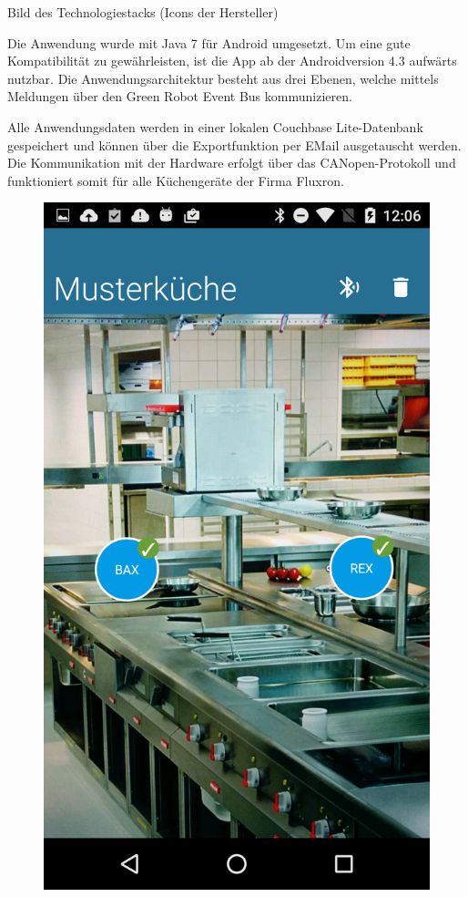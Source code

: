 Bild des Technologiestacks (Icons der Hersteller)

Die Anwendung wurde mit Java 7 für Android umgesetzt. Um eine gute Kompatibilität zu gewährleisten, ist die App ab der Androidversion 4.3 aufwärts nutzbar. Die Anwendungsarchitektur besteht aus drei Ebenen, welche mittels Meldungen über den Green Robot Event Bus kommunizieren.

Alle Anwendungsdaten werden in einer lokalen Couchbase Lite-Datenbank gespeichert und können über die Exportfunktion per EMail ausgetauscht werden. Die Kommunikation mit der Hardware erfolgt über das CANopen-Protokoll und funktioniert somit für alle Küchengeräte der Firma Fluxron.

\begin{figure}
	\vspace{-1.1cm}
	\begin{center}
		\includegraphics[scale=0.12]{start/img/screenshot}
	\end{center}
	\vspace{-1cm}
\end{figure}

